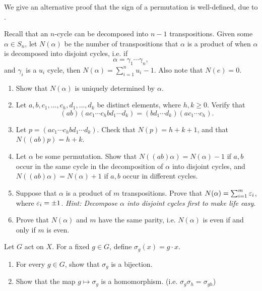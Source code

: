 \documentclass[./main.tex]{subfiles}
\begin{document}
\begin{exercise}
\label{ex:jacobson-permutation-sign}
    We give an alternative proof that the sign of a permutation is well-defined,
    due to \autocite[\pno~50]{Jacobson_2009}.

    Recall that an $n$-cycle can be decomposed into $n-1$ transpositions. Given
    some $\alpha \in S_n$, let $N(\alpha)$ be the number of transpositions that
    $\alpha$ is a product of when $\alpha$ is decomposed into disjoint cycles, i.e. 
    if 
    \[
        \alpha = \gamma_1 \cdots \gamma_n,
    \]
    and $\gamma_i$ is a $u_i$ cycle, then $N(\alpha) = \sum_{i=1}^n u_i - 1$.
    Also note that $N(e) = 0$.
    \begin{enumerate}[label=(\alph*)]
        \item Show that $N(\alpha)$ is uniquely determined by $\alpha$. 
        \item Let $a, b, c_1, \dots, c_h, d_1, \dots, d_k$ be distinct elements,
        where $h, k \geq 0$. Verify that 
        \[
            (ab)(ac_1 \cdots c_h b d_1 \cdots d_k) = (bd_1 \cdots d_k)(ac_1 \cdots c_h).
        \]
        \item Let $p = (ac_1 \cdots c_h b d_1 \cdots d_k)$. Check that $N(p) = h
        + k + 1$, and that $N((ab)p) = h + k$. 
        \item Let $\alpha$ be some permutation. Show that $N((ab) \alpha) =
        N(\alpha) - 1$ if $a, b$ occur in the same cycle in the decomposition of
        $\alpha$ into disjoint cycles, and $N((ab)\alpha) = N(\alpha) + 1$ if
        $a, b$ occur in different cycles. 
        \item Suppose that $\alpha$ is a product of $m$ transpositions. Prove
        that $N(\alpha) = \sum_{i=1}^m \varepsilon_i$, where $\varepsilon_i = \pm 1$.
        \textit{Hint: Decompose $\alpha$ into disjoint cycles first to make life
        easy}.
        \item Prove that $N(\alpha)$ and $m$ have the same parity, i.e.
        $N(\alpha)$ is even if and only if $m$ is even.
    \end{enumerate}
\end{exercise}

\begin{exercise}
\label{ex:group-actions-symmetric-group}
    Let $G$ act on $X$. For a fixed $g \in G$, define $\sigma_g(x) = g \cdot x$. 
    \begin{enumerate}
        \item For every $g \in G$, show that $\sigma_g$ is a bijection.
        \item Show that the map $g \mapsto \sigma_g$ is a homomorphism. (i.e.
        $\sigma_g \sigma_h = \sigma_{gh}$)
    \end{enumerate}
\end{exercise}
\end{document}
